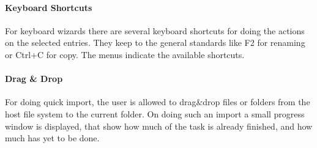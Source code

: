 \paragraph{Keyboard Shortcuts}
For keyboard wizards there are several keyboard shortcuts for doing the actions
on the selected entries. They keep to the general standards like F2 for renaming
or Ctrl+C for copy. The menus indicate the available shortcuts.
\paragraph{Drag \& Drop}
For doing quick import, the user is allowed to drag\&drop files or folders from
the host file system to the current folder. On doing such an import a small
progress window is displayed, that show how much of the task is already
finished, and how much has yet to be done.
